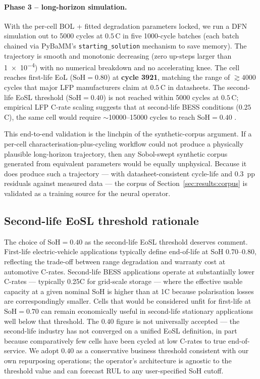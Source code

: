 \documentclass[preprint,12pt,3p,authoryear]{elsarticle}
\begin{document}
\paragraph{Phase 3 -- long-horizon simulation.}
With the per-cell BOL + fitted degradation parameters locked, we run a
DFN simulation out to \num{5000} cycles at \(0.5\)\,C in five \num{1000}-cycle
batches (each batch chained via PyBaMM's
\texttt{starting\_solution} mechanism to save memory). The trajectory
is smooth and monotonic decreasing (zero up-steps larger than
\num{1e-4}) with no numerical breakdown and no accelerating knee.
The cell reaches first-life EoL (\(\text{SoH}=0.80\)) at
\textbf{cycle \num{3921}}, matching the range of ${\gtrsim}\num{4000}$
cycles that major LFP manufacturers claim at \(0.5\)\,C in datasheets.
The second-life EoSL threshold (\(\text{SoH}=0.40\)) is not reached
within \num{5000} cycles at \(0.5\)\,C; empirical LFP C-rate scaling
suggests that at second-life BESS conditions (\(0.25\)\,C), the same
cell would require \(\sim\)\num{10000}--\num{15000} cycles to reach
\(\text{SoH}=0.40\) \citep{peterson2010lithium}.

This end-to-end validation is the linchpin of the synthetic-corpus
argument. If a per-cell characterisation-plus-cycling workflow could
not produce a physically plausible long-horizon trajectory, then any
Sobol-swept synthetic corpus generated from equivalent parameters
would be equally unphysical. Because it does produce such a trajectory
--- with datasheet-consistent cycle-life and \SI{0.3}{pp} residuals
against measured data --- the corpus of Section~\ref{sec:results:corpus}
is validated as a training source for the neural operator.

\subsection{Second-life EoSL threshold rationale}
\label{sec:results:eosl_rationale}

The choice of SoH\(=0.40\) as the second-life EoSL threshold deserves
comment. First-life electric-vehicle applications typically define
end-of-life at SoH \num{0.70}--\num{0.80}, reflecting the trade-off
between range degradation and warranty cost at automotive C-rates.
Second-life BESS applications operate at substantially lower C-rates ---
typically \num{0.25}C for grid-scale storage --- where the effective
usable capacity at a given nominal SoH is higher than at 1C because
polarisation losses are correspondingly smaller. Cells that would be
considered unfit for first-life at \(\text{SoH} = 0.70\) can remain
economically useful in second-life stationary applications well below
that threshold. The \(0.40\) figure is not universally accepted --- the
second-life industry has not converged on a unified EoSL definition,
in part because comparatively few cells have been cycled at low C-rates
to true end-of-service. We adopt \(0.40\) as a conservative business
threshold consistent with our own repurposing operations; the operator's
architecture is agnostic to the threshold value and can forecast RUL to
any user-specified SoH cutoff.
\end{document}
